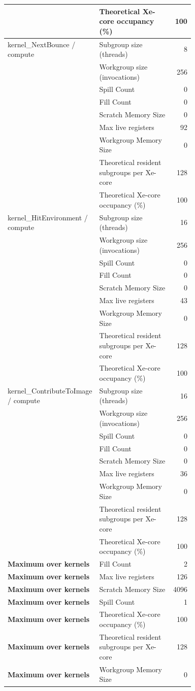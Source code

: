 \begin{longtable}{p{0.30\linewidth}p{0.43\linewidth}r}
 & Theoretical Xe-core occupancy (\%) & 100 \\
\hline
kernel\_NextBounce / compute & Subgroup size (threads) & 8 \\
 & Workgroup size (invocations) & 256 \\
 & Spill Count & 0 \\
 & Fill Count & 0 \\
 & Scratch Memory Size & 0 \\
 & Max live registers & 92 \\
 & Workgroup Memory Size & 0 \\
 & Theoretical resident subgroups per Xe-core & 128 \\
 & Theoretical Xe-core occupancy (\%) & 100 \\
\hline
kernel\_HitEnvironment / compute & Subgroup size (threads) & 16 \\
 & Workgroup size (invocations) & 256 \\
 & Spill Count & 0 \\
 & Fill Count & 0 \\
 & Scratch Memory Size & 0 \\
 & Max live registers & 43 \\
 & Workgroup Memory Size & 0 \\
 & Theoretical resident subgroups per Xe-core & 128 \\
 & Theoretical Xe-core occupancy (\%) & 100 \\
\hline
kernel\_ContributeToImage / compute & Subgroup size (threads) & 16 \\
 & Workgroup size (invocations) & 256 \\
 & Spill Count & 0 \\
 & Fill Count & 0 \\
 & Scratch Memory Size & 0 \\
 & Max live registers & 36 \\
 & Workgroup Memory Size & 0 \\
 & Theoretical resident subgroups per Xe-core & 128 \\
 & Theoretical Xe-core occupancy (\%) & 100 \\
\hline
\textbf{Maximum over kernels} & Fill Count & 2 \\
\textbf{Maximum over kernels} & Max live registers & 126 \\
\textbf{Maximum over kernels} & Scratch Memory Size & 4096 \\
\textbf{Maximum over kernels} & Spill Count & 1 \\
\textbf{Maximum over kernels} & Theoretical Xe-core occupancy (\%) & 100 \\
\textbf{Maximum over kernels} & Theoretical resident subgroups per Xe-core & 128 \\
\textbf{Maximum over kernels} & Workgroup Memory Size & 0 \\
\hline
\end{longtable}
